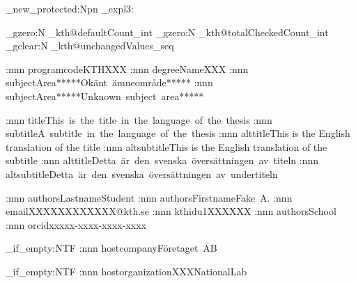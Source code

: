\cs_new_protected:Npn \kth@perform@sanity@check_expl3: {
    \int_gzero:N \g_kth@defaultCount_int
    \int_gzero:N \g_kth@totalCheckedCount_int
    \seq_gclear:N \g_kth@unchangedValues_seq


    \kth@check@value:nnn {programcode}{\@programcode}{KTHXXX}
    \kth@check@value:nnn {degreeName}{\@degreeName}{XXX}
    \ifinswedish
    \kth@check@value:nnn {subjectArea}{\@subjectArea}{*****Okänt~ämneområde*****}
    \else
    \kth@check@value:nnn {subjectArea}{\@subjectArea}{*****Unknown~subject~area*****}
    \fi
    
    \kth@check@value:nnn {title}{\@title}{This~is~the~title~in~the~language~of~the~thesis}
    \kth@check@value:nnn {subtitle}{\@subtitle}{A~subtitle~in~the~language~of~the~thesis}
    \ifinswedish
    \kth@check@value:nnn {alttitle}{\@alttitle}{This is the English translation of the title}
    \kth@check@value:nnn {altsubtitle}{\@altsubtitle}{This is the English translation of the subtitle}
    \else
    \kth@check@value:nnn {alttitle}{\@alttitle}{Detta~är~den~svenska~översättningen~av~titeln}
    \kth@check@value:nnn {altsubtitle}{\@altsubtitle}{Detta~är~den~svenska~översättningen~av~undertiteln}
    \fi

    \kth@check@value:nnn {authorsLastname}{\@authorsLastname}{Student}
    \kth@check@value:nnn {authorsFirstname}{\@authorsFirstname}{Fake~A.}
    \kth@check@value:nnn {email}{\@email}{XXXXXXXXXXXX@kth.se}
    \kth@check@value:nnn {kthid}{\@kthid}{u1XXXXXX}
    \kth@check@value:nnn {authorsSchool}{\@authorsSchool}{}
    \kth@check@value:nnn {orcid}{\@orcid}{xxxxx-xxxx-xxxx-xxxx}

    \tl_if_empty:NTF \@hostcompany
    { %
    }
    { %
    \kth@check@value:nnn {hostcompany}{\@hostcompany}{Företaget~AB}
    }

    \tl_if_empty:NTF \@hostorganization
    { %
    }
    { %
    \kth@check@value:nnn {hostorganization}{\@hostorganization}{XXXNationalLab}
    }

}
